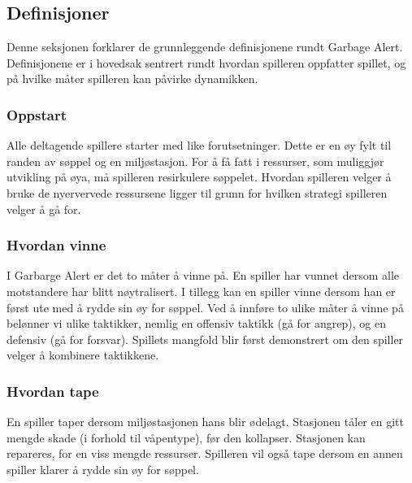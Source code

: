 \subsection{Definisjoner}
Denne seksjonen forklarer de grunnleggende definisjonene rundt Garbage
Alert. Definisjonene er i hovedsak sentrert rundt hvordan spilleren
oppfatter spillet, og på hvilke måter spilleren kan påvirke dynamikken.
\subsubsection{Oppstart}
Alle deltagende spillere starter med like forutsetninger. Dette er en øy
fylt til randen av søppel og en miljøstasjon. For å få fatt i ressurser, 
som muliggjør utvikling på øya, må spilleren resirkulere søppelet.  Hvordan
spilleren velger å bruke de nyervervede ressursene ligger til grunn for
hvilken strategi spilleren velger å gå for.
\subsubsection{Hvordan vinne}
I Garbarge Alert er det to måter å vinne på. En spiller har vunnet
dersom alle motstandere har blitt nøytralisert. I tillegg kan en spiller
vinne dersom han er først ute med å rydde sin øy for søppel.  Ved å
innføre to ulike måter å vinne på belønner vi ulike taktikker, nemlig en offensiv
taktikk (gå for angrep), og en defensiv (gå for forsvar).  Spillets
mangfold blir først demonstrert om den spiller velger å kombinere
taktikkene.
\subsubsection{Hvordan tape}
En spiller taper dersom miljøstasjonen hans blir ødelagt. Stasjonen
tåler en gitt mengde skade (i forhold til våpentype), før den kollapser.
Stasjonen kan repareres, for en viss mengde ressurser.
Spilleren vil også tape dersom en annen spiller klarer å rydde sin øy
for søppel.

